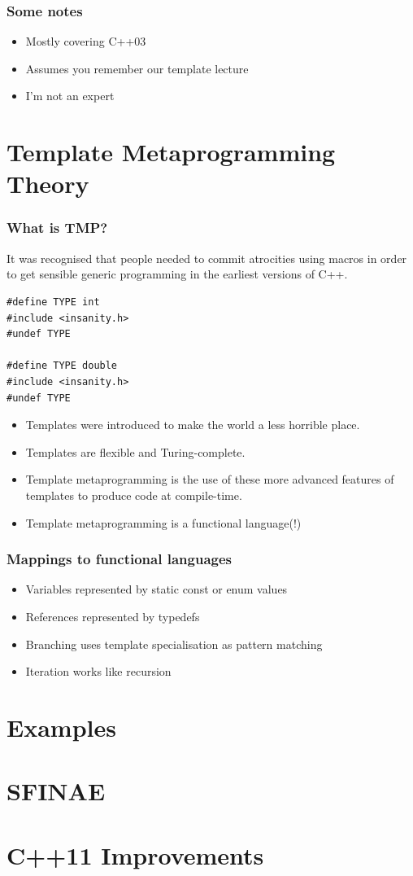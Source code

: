 \documentclass{beamer}
\begin{document}
  \begin{frame}
    \frametitle{Some notes}
    \begin{itemize}
      \pause
      \item Mostly covering C++03
      \pause
      \item Assumes you remember our template lecture
      \pause
      \item I'm not an expert
    \end{itemize}
  \end{frame}
  \section{Template Metaprogramming Theory}
  \begin{frame}[fragile]
    \frametitle{What is TMP?}
    \pause
    It was recognised that people needed to commit atrocities using macros in
    order to get sensible generic programming in the earliest versions of C++.
    \pause

    \begin{lstlisting}
#define TYPE int
#include <insanity.h>
#undef TYPE

#define TYPE double
#include <insanity.h>
#undef TYPE
    \end{lstlisting}

    \begin{itemize}
      \pause
      \item Templates were introduced to make the world a less horrible place.
      \pause
      \item Templates are flexible and Turing-complete.
      \pause
      \item Template metaprogramming is the use of these more advanced features
        of templates to produce code at compile-time.
      \pause
      \item Template metaprogramming is a functional language(!)
    \end{itemize}
\end{frame}
  \begin{frame}
    \frametitle{Mappings to functional languages}
    \begin{itemize}
        \pause
        \item Variables represented by static const or enum values
        \pause
        \item References represented by typedefs
        \pause
        \item Branching uses template specialisation as pattern matching
        \pause
        \item Iteration works like recursion
    \end{itemize}
  \end{frame}
  \section{Examples}
  \section{SFINAE}
  \section{C++11 Improvements}
\end{document}
